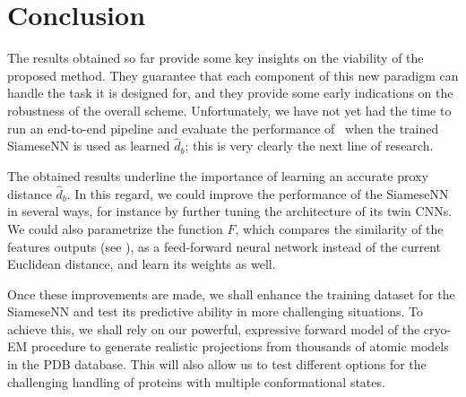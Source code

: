 \section{Conclusion}

The results obtained so far provide some key insights on the viability of the proposed method. They guarantee that each component of this new paradigm can handle the task it is designed for, and they provide some early indications on the robustness of the overall scheme. Unfortunately, we have not yet had the time to run an end-to-end pipeline and evaluate the performance of~ when the trained SiameseNN is used as learned $\widehat{d}_b$; this is very clearly the next line of research.

The obtained results underline the importance of learning an accurate proxy distance $\widehat{d}_b$. In this regard, we could improve the performance of the SiameseNN in several ways, for instance by further tuning the architecture of its twin CNNs. We could also parametrize the function $F$, which compares the similarity of the features outputs (see ), as a feed-forward neural network instead of the current Euclidean distance, and learn its weights as well.

Once these improvements are made, we shall enhance the training dataset for the SiameseNN and test its predictive ability in more challenging situations. To achieve this, we shall rely on our powerful, expressive forward model of the cryo-EM procedure to generate realistic projections from thousands of atomic models in the PDB database. This will also allow us to test different options for the challenging handling of proteins with multiple conformational states.

